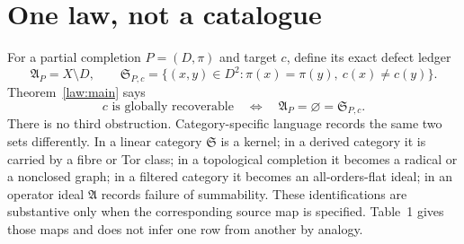 \documentclass[11pt]{article}
\theoremstyle{definition}
\theoremstyle{remark}
\begin{document}
\section{One law, not a catalogue}

For a partial completion $P=(D,\pi)$ and target $c$, define its exact defect ledger
\[
 \mathfrak A_P=X\setminus D,\qquad
 \mathfrak S_{P,c}
 =\{(x,y)\in D^2:\pi(x)=\pi(y),\ c(x)\ne c(y)\}.
 \tag{7.1}
\]
Theorem~\ref{law:main} says
\[
 c\text{ is globally recoverable}\quad\Longleftrightarrow\quad
 \mathfrak A_P=\varnothing=\mathfrak S_{P,c}.
 \tag{7.2}
\]
There is no third obstruction.  Category-specific language records the same two sets differently.
In a linear category $\mathfrak S$ is a kernel; in a derived category it is carried by a fibre or
Tor class; in a topological completion it becomes a radical or a nonclosed graph; in a filtered
category it becomes an all-orders-flat ideal; in an operator ideal $\mathfrak A$ records failure
of summability.  These identifications are substantive only when the corresponding source map is
specified.  Table~1 gives those maps and does not infer one row from another by analogy.
\end{document}
